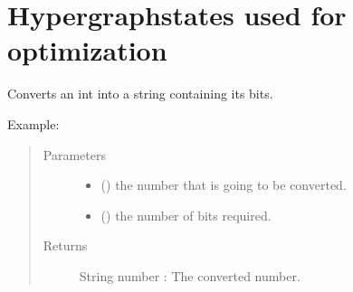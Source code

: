 \documentclass[letterpaper,10pt,english]{sphinxmanual}
\begin{document}
\chapter{Hypergraphstates used for optimization}
\label{\detokenize{hypergraphstates-opti:module-mermin_on_qiskit.hypergraphstates_optimization.hypergraphstates}}\label{\detokenize{hypergraphstates-opti:hypergraphstates-used-for-optimization}}\label{\detokenize{hypergraphstates-opti::doc}}

\begin{fulllineitems}
\label{\detokenize{hypergraphstates-opti:mermin_on_qiskit.hypergraphstates_optimization.hypergraphstates.convert_in_binary}}
Converts an int into a string containing its bits.
\begin{description}
\item[{Example:}] \leavevmode
\begin{sphinxVerbatim}[commandchars=\\\{\}]
\end{sphinxVerbatim}

\end{description}
\begin{quote}\begin{description}
\item[{Parameters}] \leavevmode\begin{itemize}
\item {} 
 () \textendash{} the number that is going to be converted.

\item {} 
 () \textendash{} the number of bits required.

\end{itemize}

\item[{Returns}] \leavevmode
String number : The converted number.

\end{description}\end{quote}

\end{fulllineitems}
\end{document}
